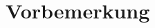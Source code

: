 \documentclass[../main/thesis.tex]{subfiles}
\begin{document}




\chapter*{Vorbemerkung}
\thispagestyle{empty}
\end{document}
